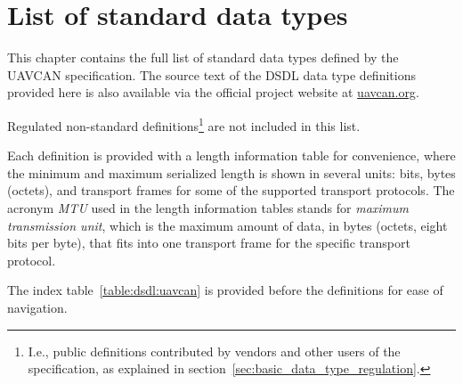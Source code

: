 \chapter{List of standard data types}\label{sec:sdt}

This chapter contains the full list of standard data types defined by the UAVCAN specification.
The source text of the DSDL data type definitions provided here is also available via the
official project website at \href{http://uavcan.org}{uavcan.org}.

Regulated non-standard definitions\footnote{%
    I.e., public definitions contributed by vendors and other users
    of the specification, as explained in section~\ref{sec:basic_data_type_regulation}.
} are not included in this list.

Each definition is provided with a length information table for convenience,
where the minimum and maximum serialized length is shown in several units:
bits, bytes (octets), and transport frames for some of the supported transport protocols.
The acronym \emph{MTU} used in the length information tables stands for
\emph{maximum transmission unit}, which is the maximum amount of data, in bytes (octets, eight bits per byte),
that fits into one transport frame for the specific transport protocol.

The index table~\ref{table:dsdl:uavcan} is provided before the definitions for ease of navigation.

\clearpage{}
